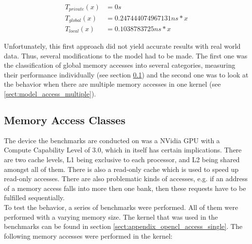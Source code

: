 \begin{align}
	\label{eq:model_access_private}	T_{private}(x) &= 0s\\
	\label{eq:model_access_global}	T_{global}(x) &= 0.247444074967131ns * x\\
	\label{eq:model_access_local}   T_{local}(x) &= 0.1038783725ns * x
\end{align}

Unfortunately, this first approach did not yield accurate results with real world data. Thus, several modifications to the model had to be made. The first one was the classification of global memory accesses into several categories, measuring their performance individually (see section \ref{sect:model_access_classes}) and the second one was to look at the behavior when there are multiple memory accesses in one kernel (see \ref{sect:model_access_multiple}).\\

\subsection{Memory Access Classes}
\label{sect:model_access_classes}
The device the benchmarks are conducted on was a NVidia GPU with a Compute Capability Level of 3.0, which in itself has certain implications. There are two cache levels, L1 being exclusive to each processor, and L2 being shared amongst all of them. There is also a read-only cache which is used to speed up read-only accesses. There are also problematic kinds of accesses, e.g. if an address of a memory access falls into more then one bank, then these requests have to be fulfilled sequentially. \cite{nvidia2009opencl}\\

To test the behavior, a series of benchmarks were performed. All of them were performed with a varying memory size. The kernel that was used in the benchmarks can be found in section \ref{sect:appendix_opencl_access_single}. The following memory accesses were performed in the kernel: \\

